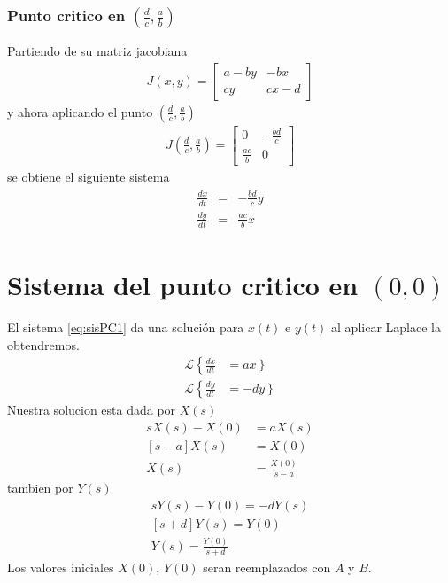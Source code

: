 \documentclass{report}
\begin{document}
\subsubsection{Punto critico en $(\frac{d}{c},\frac{a}{b})$}
Partiendo de su matriz jacobiana
\begin{align*}
J(x,y)=
\left[
\begin{matrix}
a-by &-bx\\
cy &cx-d
\end{matrix}\right]
\end{align*}
y ahora aplicando el punto $(\frac{d}{c},\frac{a}{b})$
\begin{align}
J(\frac{d}{c},\frac{a}{b})=
\left[
\begin{matrix}
0 &-\frac{bd}{c}\\
\frac{ac}{b} &0
\end{matrix}\right]
\end{align}
se obtiene el siguiente sistema
\begin{align}
\begin{array}{ccc}
\frac{dx}{dt}&= &-\frac{bd}{c}y \\
\frac{dy}{dt}&= &\frac{ac}{b}x
\end{array}\label{eq:sisPC2}
\end{align}

\section{Sistema del punto critico en $(0,0)$}
El sistema \ref{eq:sisPC1} da una solución para $x(t)$ e $y(t)$ al aplicar Laplace la obtendremos.
\begin{align*}
\mathcal{L}\left\{\frac{dx}{dt} \right.&= \left. ax\right\} \\
\mathcal{L}\left\{ \frac{dy}{dt}\right.&= \left.-dy \right\}
\end{align*}
Nuestra solucion esta dada por $X(s)$
\begin{align}
sX(s)-X(0)&=aX(s) \nonumber\\
\left[s-a\right]X(s) &=X(0) \\
X(s)&= \frac{X(0)}{s-a} \label{eq:xsLap}
\end{align}
tambien por $Y(s)$
\begin{align}
sY(s)-Y(0)=-dY(s) \nonumber \\
\left[s+d\right]Y(s)=Y(0)\nonumber \\
Y(s)=\frac{Y(0)}{s+d}
 \label{eq:ysLap}
\end{align}
Los valores iniciales $X(0)$, $Y(0)$ seran reemplazados con $A$ y $B$.
\end{document}
